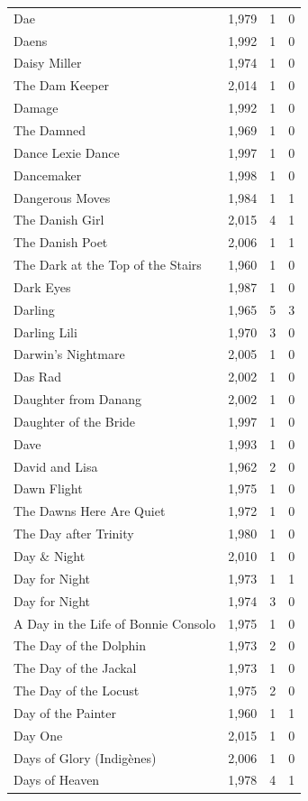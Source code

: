\begin{tabular}{lrrr}
Dae & 1,979 & 1 & 0 \\
Daens & 1,992 & 1 & 0 \\
Daisy Miller & 1,974 & 1 & 0 \\
The Dam Keeper & 2,014 & 1 & 0 \\
Damage & 1,992 & 1 & 0 \\
The Damned & 1,969 & 1 & 0 \\
Dance Lexie Dance & 1,997 & 1 & 0 \\
Dancemaker & 1,998 & 1 & 0 \\
Dangerous Moves & 1,984 & 1 & 1 \\
The Danish Girl & 2,015 & 4 & 1 \\
The Danish Poet & 2,006 & 1 & 1 \\
The Dark at the Top of the Stairs & 1,960 & 1 & 0 \\
Dark Eyes & 1,987 & 1 & 0 \\
Darling & 1,965 & 5 & 3 \\
Darling Lili & 1,970 & 3 & 0 \\
Darwin's Nightmare & 2,005 & 1 & 0 \\
Das Rad & 2,002 & 1 & 0 \\
Daughter from Danang & 2,002 & 1 & 0 \\
Daughter of the Bride & 1,997 & 1 & 0 \\
Dave & 1,993 & 1 & 0 \\
David and Lisa & 1,962 & 2 & 0 \\
Dawn Flight & 1,975 & 1 & 0 \\
The Dawns Here Are Quiet & 1,972 & 1 & 0 \\
The Day after Trinity & 1,980 & 1 & 0 \\
Day \& Night & 2,010 & 1 & 0 \\
Day for Night & 1,973 & 1 & 1 \\
Day for Night & 1,974 & 3 & 0 \\
A Day in the Life of Bonnie Consolo & 1,975 & 1 & 0 \\
The Day of the Dolphin & 1,973 & 2 & 0 \\
The Day of the Jackal & 1,973 & 1 & 0 \\
The Day of the Locust & 1,975 & 2 & 0 \\
Day of the Painter & 1,960 & 1 & 1 \\
Day One & 2,015 & 1 & 0 \\
Days of Glory (Indigènes) & 2,006 & 1 & 0 \\
Days of Heaven & 1,978 & 4 & 1 \\

\end{tabular}
